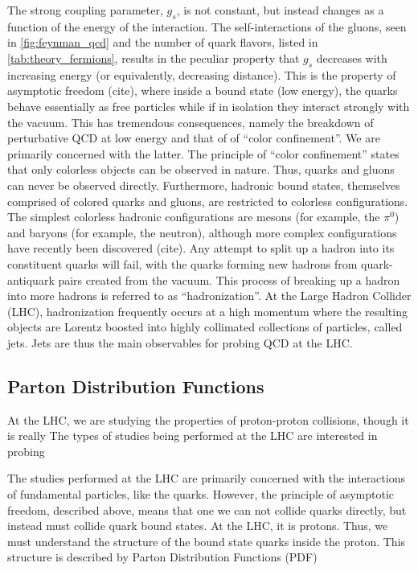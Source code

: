 The strong coupling parameter, $g_s$, is not constant, but instead
changes as a function of the energy of the interaction. The self-interactions
of the gluons, seen in \fig\ref{fig:feynman_qcd} and the number of 
quark flavors, listed in \tab\ref{tab:theory_fermions},
results in the peculiar property that $g_s$ decreases with increasing energy 
(or equivalently, decreasing distance).
This is the property of asymptotic freedom (cite), 
where inside a bound state (low energy), the quarks behave essentially
as free particles while if in isolation they interact strongly with the 
vacuum. 
This has tremendous consequences, namely 
the breakdown of perturbative QCD at low energy
and that of of ``color confinement''.
We are primarily concerned with the latter.
The principle of ``color confinement'' states that
only colorless objects can be observed in nature. Thus, quarks and gluons can
never be observed directly. Furthermore, hadronic bound states,
themselves comprised of colored quarks and gluons, are restricted
to colorless configurations. The simplest colorless hadronic configurations
are mesons (for example, the $\pi^0$) and baryons (for example, the neutron),
although more complex configurations have recently been discovered (cite).
Any attempt to split up a hadron into its constituent quarks 
will fail, with the quarks forming new hadrons from quark-antiquark
pairs created from the vacuum. This process of breaking up a 
hadron into more hadrons is referred to as ``hadronization''.
At the Large Hadron Collider (LHC), hadronization frequently occurs
at a high momentum where the resulting objects are Lorentz boosted 
into highly collimated collections of particles, called jets. 
Jets are thus the main observables for probing QCD at the LHC.


\subsection{Parton Distribution Functions}

At the LHC, we are studying the properties of proton-proton collisions,
though it is really 
The types of studies being performed at the LHC are interested in probing

The studies performed at the LHC are primarily concerned with the 
interactions of fundamental particles, like the quarks. However, the
principle of asymptotic freedom, described above, means
that one we can not collide quarks directly, but instead must
collide quark bound states. At the LHC, it is protons. 
Thus, we must understand the structure of the bound state quarks
inside the proton.
This structure is described by Parton Distribution Functions (PDF)

